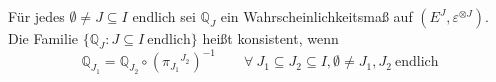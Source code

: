Für jedes $\emptyset \neq J \subseteq I$ endlich sei $\mathbb{Q}_{J}$ ein Wahrscheinlichkeitsmaß auf $(E^{J},\varepsilon^{ \otimes J})$. Die Familie $\lbrace \mathbb{Q}_{J} : J \subseteq I \: \mathrm{endlich}\rbrace$ heißt konsistent, wenn
\begin{equation*}
\mathbb{Q}_{J_{1}} = {\mathbb{Q}}_{J_{2}} \circ {({\pi_{J_{1}}}^{J_{2}})}^{-1} \qquad \forall \: J_{1} \subseteq J_{2} \subseteq I, \emptyset \neq J_{1},J_{2} \: \mathrm{endlich}
\end{equation*}